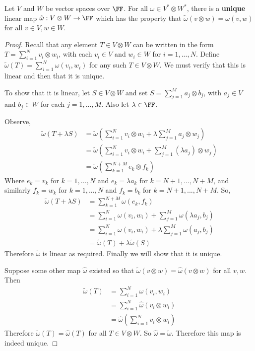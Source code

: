 \begin{thm}
Let $V$ and $W$ be vector spaces over $\FF$.
For all $\omega \in V^* \otimes W^*$, there is a \textbf{unique} linear map $\tilde{\omega} : V\otimes W \to \FF$ which has the property that $\tilde{\omega}(v\otimes w) = \omega(v,w)$ for all $v\in V,w\in W$.
\end{thm}
\begin{proof}
Recall that any element $T\in V\otimes W$ can be written in the form $T = \sum_{i=1}^N v_i\otimes w_i$, with each $v_i\in V$ and $w_i \in W$ for $i=1,...,N$. Define $\tilde{\omega}(T) = \sum_{i=1}^N \omega(v_i,w_i)$ for any such $T \in V\otimes W$. We must verify that this is linear and then that it is unique.

To show that it is linear, let $S\in V\otimes W$ and set $S = \sum_{j=1}^M a_j\otimes b_j$, with $a_j\in V$ and $b_j\in W$ for each $j=1,...,M$. Also let $\lambda \in \FF$.

 Observe,
\begin{align*}
    \tilde{\omega}(T+\lambda S) &= \tilde{\omega}\left(\sum_{i=1}^N v_i\otimes w_i + \lambda\sum_{j=1}^M a_j\otimes w_j\right)\\
    &= \tilde{\omega}\left(\sum_{i=1}^N v_i\otimes w_i + \sum_{j=1}^M (\lambda a_j)\otimes w_j\right)\\
    &= \tilde{\omega}\left(\sum_{k=1}^{N+M} e_k\otimes f_k\right)
\end{align*}
Where $e_k = v_k$ for $k=1,...,N$ and $e_k = \lambda a_k$ for $k=N+1,...,N+M$, and similarly $f_k = w_k$ for $k=1,...,N$ and $f_k = b_k$ for $k=N+1,...,N+M$. So,
\begin{align*}
    \tilde{\omega}(T+\lambda S) &= \sum_{k=1}^{N+M} \omega(e_k,f_k)\\
    &= \sum_{i=1}^N \omega(v_i,w_i) + \sum_{j=1}^M \omega(\lambda a_j,b_j)\\
    &= \sum_{i=1}^N \omega(v_i,w_i) + \lambda\sum_{j=1}^M \omega( a_j,b_j)\\
    &= \tilde{\omega}(T) + \lambda\tilde{\omega}(S)
\end{align*}
Therefore $\tilde{\omega}$ is linear as required. Finally we will show that it is unique.

Suppose some other map $\hat{\omega}$ existed so that $\tilde{\omega}(v\otimes w) = \hat{\omega}(v\otimes w)$ for all $v,w$. Then 
\begin{align*}\tilde{\omega}(T) &= \sum_{i=1}^N \omega(v_i,w_i) \\
&= \sum_{i=1}^N\hat{\omega}(v_i\otimes w_i)\\
&= \hat{\omega}\left(\sum_{i=1}^N v_i\otimes w_i\right) 
\end{align*}
Therefore $\tilde{\omega}(T) = \hat{\omega}(T)$ for all $T \in V\otimes W$. So $\hat{\omega}=\tilde{\omega}$. Therefore this map is indeed unique.
\end{proof}


